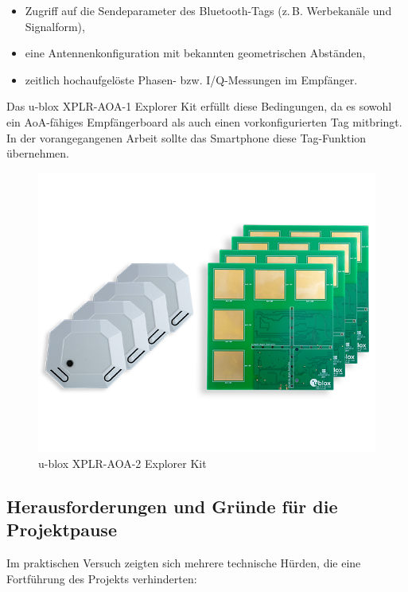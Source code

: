 \documentclass[a4paper, 12pt]{article} %
\begin{document}
\begin{itemize}[leftmargin=2em]
  \item Zugriff auf die Sendeparameter des Bluetooth-Tags (z.\,B. Werbe­kanäle und Signalform),
  \item eine Antennenkonfiguration mit bekannten geometrischen Abständen,
  \item zeitlich hochaufgelöste Phasen- bzw. I/Q-Messungen im Empfänger.
\end{itemize}

Das u-blox XPLR-AOA-1 Explorer Kit erfüllt diese Bedingungen, da es sowohl ein \ac{AoA}-fähiges Empfängerboard als auch einen vorkonfigurierten 
Tag mitbringt. In der vorangegangenen Arbeit sollte das Smartphone diese Tag-Funktion übernehmen.

\begin{figure}[H]
  \centering
  \includegraphics[width=\linewidth]{images/XPLR-AOA-with-C209-and-C211-02_0}
  \caption{u-blox XPLR-AOA-2 Explorer Kit \cite{u-blox-xplr-aoa2}}
  \label{fig:xplr-aoa}
\end{figure}

\subsection{Herausforderungen und Gründe für die Projektpause}
Im praktischen Versuch zeigten sich mehrere technische Hürden, die eine Fortführung des Projekts verhinderten:
\end{document}
